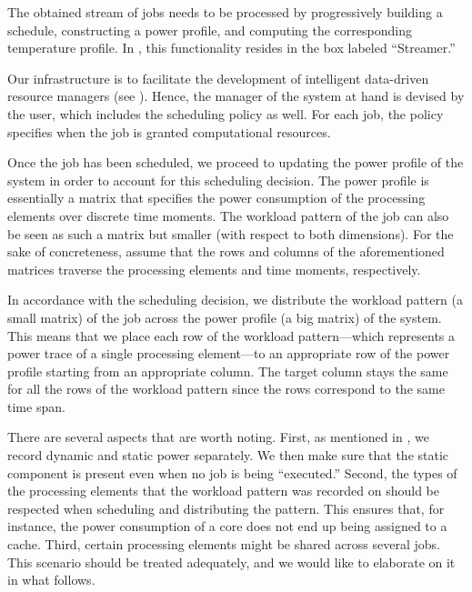 The obtained stream of jobs needs to be processed by progressively building a
schedule, constructing a power profile, and computing the corresponding
temperature profile. In , this functionality resides in the
box labeled ``Streamer.''

Our infrastructure is to facilitate the development of intelligent data-driven
resource managers (see ). Hence, the manager of the system at hand
is devised by the user, which includes the scheduling policy as well. For each
job, the policy specifies when the job is granted computational resources.

Once the job has been scheduled, we proceed to updating the power profile of the
system in order to account for this scheduling decision. The power profile is
essentially a matrix that specifies the power consumption of the processing
elements over discrete time moments. The workload pattern of the job can also be
seen as such a matrix but smaller (with respect to both dimensions). For the
sake of concreteness, assume that the rows and columns of the aforementioned
matrices traverse the processing elements and time moments, respectively.

In accordance with the scheduling decision, we distribute the workload pattern
(a small matrix) of the job across the power profile (a big matrix) of the
system. This means that we place each row of the workload pattern---which
represents a power trace of a single processing element---to an appropriate row
of the power profile starting from an appropriate column. The target column
stays the same for all the rows of the workload pattern since the rows
correspond to the same time span.

There are several aspects that are worth noting. First, as mentioned in
, we record dynamic and static power separately. We then make
sure that the static component is present even when no job is being
``executed.'' Second, the types of the processing elements that the workload
pattern was recorded on should be respected when scheduling and distributing the
pattern. This ensures that, for instance, the power consumption of a core does
not end up being assigned to a cache. Third, certain processing elements might
be shared across several jobs. This scenario should be treated adequately, and
we would like to elaborate on it in what follows.

